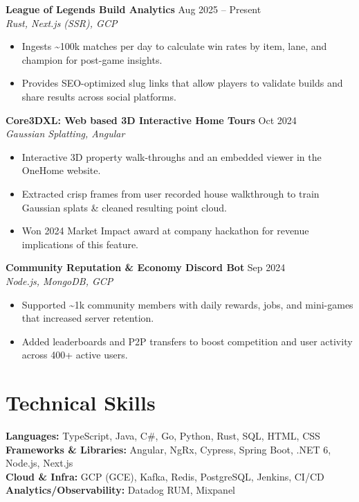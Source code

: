 \documentclass[letterpaper,10pt]{article}
\begin{document}
\textbf{League of Legends Build Analytics} \hfill Aug 2025 -- Present\\
\textit{Rust, Next.js (SSR), GCP}
\begin{itemize}
  \item Ingests \textasciitilde100k matches per day to calculate win rates by item, lane, and champion for post-game insights.
  \item Provides SEO-optimized slug links that allow players to validate builds and share results across social platforms.
\end{itemize}

\textbf{Core3DXL: Web based 3D Interactive Home Tours} \hfill Oct 2024\\
\textit{Gaussian Splatting, Angular}
\begin{itemize}
  \item Interactive 3D property walk-throughs and an embedded viewer in the OneHome website.
  \item Extracted crisp frames from user recorded house walkthrough to train Gaussian splats \& cleaned resulting point cloud.
  \item Won 2024 Market Impact award at company hackathon for revenue implications of this feature.
\end{itemize}

\textbf{Community Reputation \& Economy Discord Bot} \hfill Sep 2024\\
\textit{Node.js, MongoDB, GCP}
\begin{itemize}
  \item Supported \textasciitilde1k community members with daily rewards, jobs, and mini-games that increased server retention.
  \item Added leaderboards and P2P transfers to boost competition and user activity across 400+ active users.
\end{itemize}

\section*{Technical Skills}
\textbf{Languages:} TypeScript, Java, C\#, Go, Python, Rust, SQL, HTML, CSS \\
\textbf{Frameworks \& Libraries:} Angular, NgRx, Cypress, Spring Boot, .NET 6, Node.js, Next.js \\
\textbf{Cloud \& Infra:} GCP (GCE), Kafka, Redis, PostgreSQL, Jenkins, CI/CD \\
\textbf{Analytics/Observability:} Datadog RUM, Mixpanel
\end{document}
